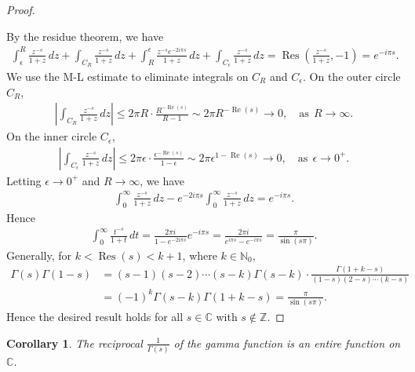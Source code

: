 \documentclass{article}
\numberwithin{equation}{section}
\newcommand{\bbC}{\mathbb{C}}
\newcommand{\bbN}{\mathbb{N}}
\newcommand{\bbZ}{\mathbb{Z}}
\DeclareMathOperator{\re}{Re}
\DeclareMathOperator{\res}{Res}
\theoremstyle{plain}
\newtheorem{corollary}[theorem]{Corollary}
\theoremstyle{definition}
\begin{document}
\begin{proof}
\begin{center}
\end{center}
By the residue theorem, we have
\begin{align*}
	\int_{\epsilon}^{R}\frac{z^{-s}}{1+z}\,dz+\int_{C_R}\frac{z^{-s}}{1+z}\,dz+\int_{R}^{\epsilon}\frac{z^{-s}e^{-2i\pi s}}{1+z}\,dz+\int_{C_\epsilon}\frac{z^{-s}}{1+z}\,dz=\res\left(\frac{z^{-s}}{1+z},-1\right)=e^{-i\pi s}.
\end{align*}
We use the M-L estimate to eliminate integrals on $C_R$ and $C_\epsilon$. On the outer circle $C_R$,
\begin{align*}
	\left\vert\int_{C_R}\frac{z^{-s}}{1+z}\,dz\right\vert\leq 2\pi R\cdot\frac{R^{-\re(s)}}{R-1}\sim 2\pi R^{-\re(s)}\to 0,\quad\text{as}\ \ R\to\infty.
\end{align*}
On the inner circle $C_\epsilon$,
\begin{align*}
	\left\vert\int_{C_\epsilon}\frac{z^{-s}}{1+z}\,dz\right\vert\leq 2\pi\epsilon\cdot\frac{\epsilon^{-\re(s)}}{1-\epsilon}\sim 2\pi\epsilon^{1-\re(s)}\to 0,\quad\text{as}\ \ \epsilon\to 0^+.
\end{align*}
Letting $\epsilon\to 0^+$ and $R\to\infty$, we have
\begin{align*}
	\int_{0}^{\infty}\frac{z^{-s}}{1+z}\,dz-e^{-2i\pi s}\int_{0}^\infty\frac{z^{-s}}{1+z}\,dz=e^{-i\pi s}.
\end{align*}
Hence
\begin{align*}
	\int_0^\infty\frac{t^{-s}}{1+t}\,dt=\frac{2\pi i}{1-e^{-2i\pi s}}e^{-i\pi s}=\frac{2\pi i}{e^{i\pi s}-e^{-i\pi s}}=\frac{\pi}{\sin(s\pi)}.
\end{align*}
Generally, for $k<\res(s)<k+1$, where $k\in\bbN_0$,
\begin{align*}
	\Gamma(s)\Gamma(1-s)&=(s-1)(s-2)\cdots(s-k)\Gamma(s-k)\cdot\frac{\Gamma(1+k-s)}{(1-s)(2-s)\cdots(k-s)}\\
	&=(-1)^k\Gamma(s-k)\Gamma(1+k-s)=\frac{\pi}{\sin(s\pi)}.
\end{align*}
Hence the desired result holds for all $s\in\bbC$ with $s\notin\bbZ$.
\end{proof}
\begin{corollary}
The reciprocal $\displaystyle\frac{1}{\Gamma(s)}$ of the gamma function is an entire function on $\bbC$.
\end{corollary}
\end{document}
